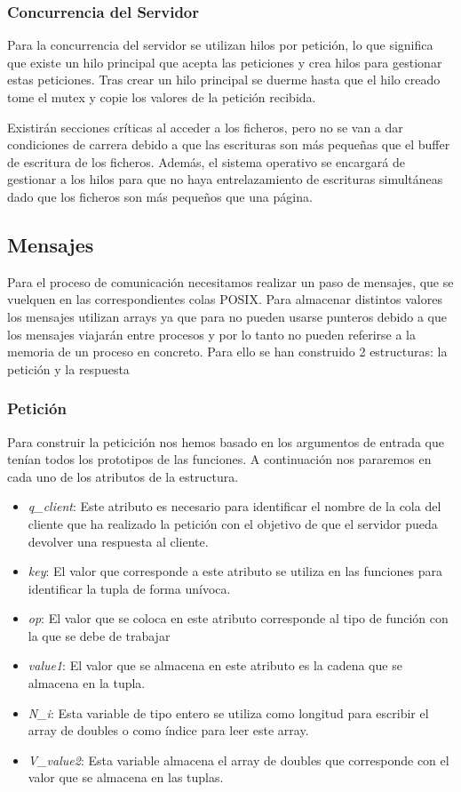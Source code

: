 \documentclass[]{article}
\begin{document}
\subsubsection{Concurrencia del Servidor}
\label{subsec::concurrencia_servidor}
Para la concurrencia del servidor se utilizan hilos por petición, lo que significa que existe un hilo principal que acepta las peticiones y crea hilos para gestionar estas peticiones.
Tras crear un hilo principal se duerme hasta que el hilo creado tome el mutex y copie los valores de la petición recibida.

Existirán secciones críticas al acceder a los ficheros, pero no se van a dar condiciones de carrera debido a que las escrituras son más pequeñas que el buffer de escritura de los ficheros. Además, el sistema operativo se encargará de gestionar a los hilos para que no haya entrelazamiento de escrituras simultáneas dado que los ficheros son más pequeños que una página.
\subsection{Mensajes}
\label{subsec:mensajes}
Para el proceso de comunicación necesitamos realizar un paso de mensajes, que se vuelquen en las correspondientes colas POSIX. Para almacenar distintos valores los mensajes utilizan arrays ya que para no pueden usarse punteros debido a que los mensajes viajarán entre procesos y por lo tanto no pueden referirse a la memoria de un proceso en concreto.
Para ello se han construido 2 estructuras: la petición y la respuesta

\subsubsection{Petición}
\label{subsec::peticion}
Para construir la peticición nos hemos basado en los argumentos de entrada que tenían todos los prototipos de las funciones. A continuación nos pararemos en cada uno de los atributos de la estructura.

\begin{itemize}
  \item \textit{q\_client}: Este atributo es necesario para identificar el nombre de la cola del cliente que ha realizado la petición con el objetivo de que el servidor pueda devolver una respuesta al cliente.
  \item \textit{key}: El valor que corresponde a este atributo se utiliza en las funciones para identificar la tupla de forma unívoca.
  \item \textit{op}: El valor que se coloca en este atributo corresponde al tipo de función con la que se debe de trabajar
  \item \textit{value1}: El valor que se almacena en este atributo es la cadena que se almacena en la tupla.
  \item \textit{N\_i}: Esta variable de tipo entero se utiliza como longitud para escribir el array de doubles o como índice para leer este array.
 \item \textit{V\_value2}: Esta variable almacena el array de doubles que corresponde con el valor que se almacena en las tuplas.
\end{itemize}
\end{document}
